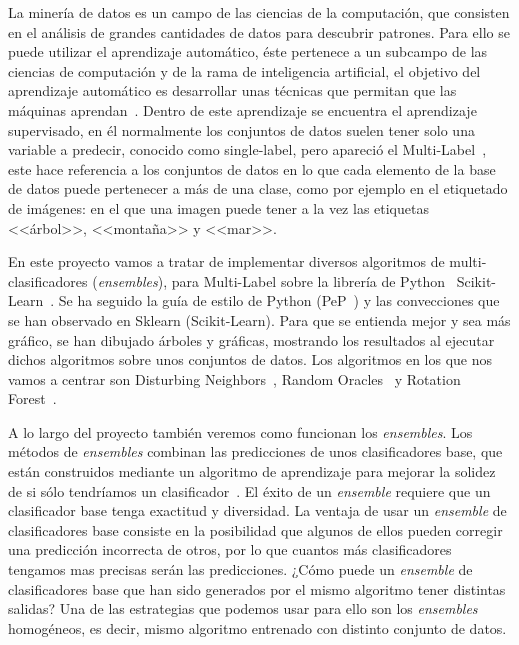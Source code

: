 
La minería de datos es un campo de 	las ciencias de la computación, que consisten en el análisis de grandes cantidades de datos para descubrir patrones.
Para ello se puede utilizar el aprendizaje automático, éste pertenece a un subcampo de las ciencias de computación y de la rama de inteligencia artificial, el objetivo del aprendizaje automático es desarrollar unas técnicas que permitan que las máquinas aprendan~\cite{wiki:datamining}.
Dentro de este aprendizaje se encuentra el aprendizaje supervisado, en él normalmente los conjuntos de datos suelen tener solo una variable a predecir, conocido como single-label, pero apareció el Multi-Label~\cite{multilabel2}, este hace referencia a los conjuntos de datos en lo que cada elemento de la base de datos puede pertenecer a más de una clase, como por ejemplo en el etiquetado de imágenes: en el que una imagen puede tener a la vez las etiquetas <<árbol>>, <<montaña>> y <<mar>>.

En este proyecto vamos a tratar de implementar diversos algoritmos de multi-clasificadores (\textit{ensembles}), para Multi-Label sobre la librería de Python~\cite{python} Scikit-Learn~\cite{scikitlearn}. Se ha seguido la guía de estilo de Python (PeP~\cite{pep}) y las convecciones que se han observado en Sklearn (Scikit-Learn). Para que se entienda mejor y sea más gráfico, se han dibujado árboles y gráficas, mostrando los resultados al ejecutar dichos algoritmos sobre unos conjuntos de datos. Los algoritmos en los que nos vamos a centrar son Disturbing Neighbors~\cite{disturbingneighbors}, Random Oracles~\cite{randomoracles} y Rotation Forest~\cite{rotationforest}.

A lo largo del proyecto también veremos como funcionan los \textit{ensembles}.
Los métodos de \textit{ensembles} combinan las predicciones de unos clasificadores base, que están construidos mediante un algoritmo de aprendizaje para mejorar la solidez de si sólo tendríamos un clasificador~\cite{ensemble}.
El éxito de un \textit{ensemble} requiere que un clasificador base tenga exactitud y diversidad.
La ventaja de usar un \textit{ensemble} de clasificadores base consiste en la posibilidad que algunos de ellos pueden corregir una predicción incorrecta de otros, por lo que cuantos más clasificadores tengamos mas precisas serán las predicciones. 
¿Cómo puede un \textit{ensemble} de clasificadores base que han sido generados por el mismo algoritmo tener distintas salidas? Una de las estrategias que podemos usar para ello son los \textit{ensembles} homogéneos, es decir, mismo algoritmo entrenado con distinto conjunto de datos.
